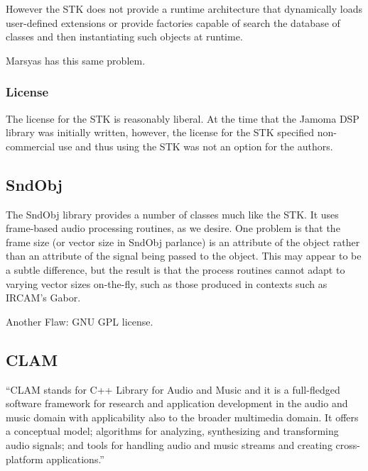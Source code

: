\documentclass[twoside,10pt]{article}
\begin{document}
However the STK does not provide a runtime architecture that dynamically loads user-defined extensions or provide factories capable of search the database of classes and then instantiating such objects at runtime.

Marsyas has this same problem.  



\subsubsection{License}
The license for the STK is reasonably liberal.  At the time that the Jamoma DSP library was initially written, however, the license for the STK specified non-commercial use and thus using the STK was not an option for the authors.  


\subsection{SndObj} %

The SndObj\cite{Lazzarini:2001} library provides a number of classes much like the STK.  It uses frame-based audio processing routines, as we desire.  One problem is that the frame size (or vector size in SndObj parlance) is an attribute of the object rather than an attribute of the signal being passed to the object.  This may appear to be a subtle difference, but the result is that the process routines cannot adapt to varying vector sizes on-the-fly, such as those produced in contexts such as IRCAM's Gabor.


Another Flaw: GNU GPL license.




\subsection{CLAM} %

``CLAM stands for C++ Library for Audio and Music and it is a full-fledged software framework for research and application development in the audio and music domain with applicability also to the broader multimedia domain. It offers a conceptual model; algorithms for analyzing, synthesizing and transforming audio signals; and tools for handling audio and music streams and creating cross-platform applications.''
\end{document}
